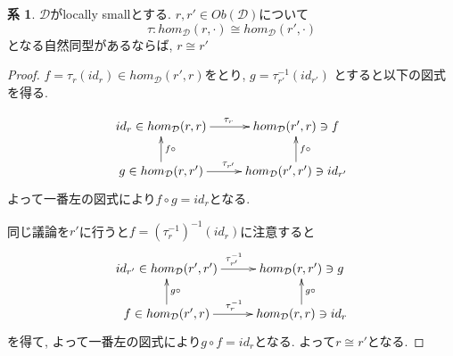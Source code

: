 \documentclass[dvipdfmx,a4paper,11pt]{report}
\theoremstyle{definition}
\newtheorem{cor}[thm]{系}
\begin{document}
 \begin{tcolorbox}
 [colback = white, colframe = green!35!black, fonttitle = \bfseries,breakable = true]
\begin{cor}
\label{cor-yoneda}
$\mathcal{D} $がlocally smallとする. $r, r' \in Ob(\mathcal{D})$について
$$
\tau : hom_{\mathcal{D}}(r, \cdot) \cong hom_{\mathcal{D}}(r', \cdot)
$$
となる自然同型があるならば, $r \cong r'$
\end{cor}
\end{tcolorbox}
\begin{proof}
$f = \tau_{r}(id_r) \in hom_{\mathcal{D}}(r',r)$をとり, 
$g = \tau_{r'}^{-1}(id_{r'})$
とすると以下の図式を得る.

\begin{equation*}
\xymatrix@C=25pt@R=20pt{
id_r \in hom_{\mathcal{D}}(r,r) \ar@{->}[r]^{\tau_{r}}
& hom_{\mathcal{D}}(r',r) \ni f\\
g \in hom_{\mathcal{D}}(r,r') \ar@{->}[r]^{\tau_{r'}} \ar@{->}[u]_{f \circ }
& hom_{\mathcal{D}}(r',r') \ar@{->}[u]_{f \circ } \ni id_{r'}\\   
}
\end{equation*}
よって一番左の図式により$f \circ g = id_{r}$となる.

同じ議論を$r'$に行うと$f = (\tau_{r}^{-1})^{-1}(id_r)$に注意すると
\begin{equation*}
\xymatrix@C=25pt@R=20pt{
id_{r'} \in hom_{\mathcal{D}}(r',r') \ar@{->}[r]^{\tau_{r'}^{-1}}
& hom_{\mathcal{D}}(r,r') \ni g\\
f \in hom_{\mathcal{D}}(r',r) \ar@{->}[r]^{\tau_{r}^{-1}} \ar@{->}[u]_{g\circ }
& hom_{\mathcal{D}}(r,r) \ar@{->}[u]_{g \circ } \ni id_{r}\\   
}
\end{equation*}
を得て, よって一番左の図式により$g \circ f= id_{r}$となる.
よって$r \cong r'$となる. 
\end{proof}
\end{document}
